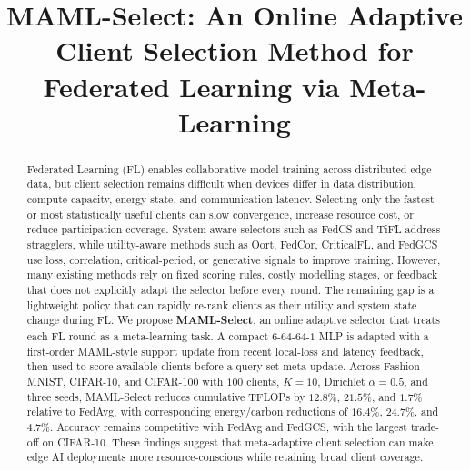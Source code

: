 \documentclass[journal]{IEEEtran}
\newcommand{\revision}[1]{#1}
\begin{document}
\title{MAML-Select: An Online Adaptive Client Selection Method for Federated Learning via Meta-Learning}


\maketitle

\begin{abstract}
\revision{Federated Learning (FL) enables collaborative model training across distributed edge data, but client selection remains difficult when devices differ in data distribution, compute capacity, energy state, and communication latency. Selecting only the fastest or most statistically useful clients can slow convergence, increase resource cost, or reduce participation coverage. System-aware selectors such as FedCS and TiFL address stragglers, while utility-aware methods such as Oort, FedCor, CriticalFL, and FedGCS use loss, correlation, critical-period, or generative signals to improve training. However, many existing methods rely on fixed scoring rules, costly modelling stages, or feedback that does not explicitly adapt the selector before every round. The remaining gap is a lightweight policy that can rapidly re-rank clients as their utility and system state change during FL. We propose \textbf{MAML-Select}, an online adaptive selector that treats each FL round as a meta-learning task. A compact $6$-$64$-$64$-$1$ MLP is adapted with a first-order MAML-style support update from recent local-loss and latency feedback, then used to score available clients before a query-set meta-update. Across Fashion-MNIST, CIFAR-10, and CIFAR-100 with $100$ clients, $K=10$, Dirichlet $\alpha=0.5$, and three seeds, MAML-Select reduces cumulative TFLOPs by $12.8\%$, $21.5\%$, and $1.7\%$ relative to FedAvg, with corresponding energy/carbon reductions of $16.4\%$, $24.7\%$, and $4.7\%$. Accuracy remains competitive with FedAvg and FedGCS, with the largest trade-off on CIFAR-10. These findings suggest that meta-adaptive client selection can make edge AI deployments more resource-conscious while retaining broad client coverage.}
\end{abstract}
\end{document}
